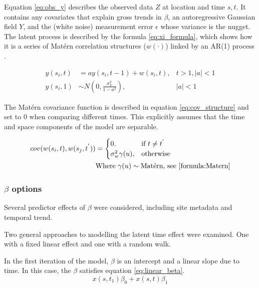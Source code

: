 Equation \ref{eq:obs_y} describes the observed data $Z$ at location and time ${s,t}$.  It contains any covariates that explain gross trends in $\beta$, an autoregressive Gaussian field $Y$, and the (white noise) measurement error $\epsilon$ whose variance is the nugget.  The latent process is described by the formula \ref{eq:xi_formula}, which shows how it is a series of Mat\'{e}rn correlation structures ($w(\cdot)$) linked by an \ac{AR}(1) process \citep{gomezGitBook, cameletti2011spatio}.

\begin{align} \label{eq:xi_formula}
	y(s_i, t) &= ay(s_i, t-1) + w(s_i,t) , &t>1, |a| < 1 \\
	y (s_i, 1) &\sim N(0, \frac{\sigma_w^{2}}{1-a^2}) , &|a| < 1 \nonumber
\end{align}

The Mat\'{e}rn covariance function is described in equation \ref{eq:cov_structure} and set to 0 when comparing different times.  This explicitly assumes that the time and space components of the model are separable. %

\begin{align} \label{eq:cov_structure}
	cov(w(s_i,t), w(s_j,t^{'})) &=
	\begin{cases} 
		0, & \text{if } t \neq t^{'} \\
		\sigma^2_w \gamma(u), & \text{otherwise}    
	\end{cases} \\
	& \text{Where } \gamma(u) \sim \text{Mat\'{e}rn, see \ref{formula:Matern}} \nonumber
\end{align} 

\subsubsection*{$\beta$ options}
\label{subsubsec:betaopts}
Several predictor effects of $\beta$ were considered, including site metadata and temporal trend.

Two general approaches to modelling the latent time effect were examined.  One with a fixed linear effect and one with a random walk.

In the first iteration of the model, $\beta$ is an intercept and a linear slope due to time.  In this case, the $\beta$ satisfies equation \ref{eq:linear_beta}.
\begin{equation} \label{eq:linear_beta} 
x(s,t_1)\beta_0 + x(s,t)\beta_1
\end{equation}  

